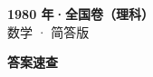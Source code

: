 \documentclass[zihao=-4, a4paper]{ctexart}
\begin{document}
\begin{center}
  {\Large\bfseries 1980 年·全国卷（理科）}\\[4pt]
  {\large 数学 · 简答版}
\end{center}
\medskip
{}

\clearpage
{}
\begin{center}{\Large\bfseries 答案速查}\end{center}
\medskip

\end{document}
